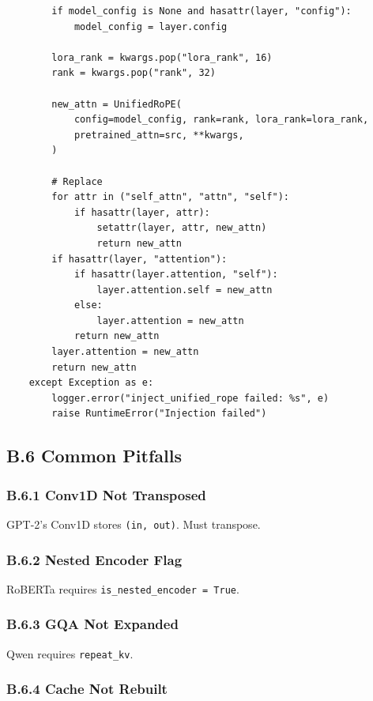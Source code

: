 {\begin{lstlisting}
        if model_config is None and hasattr(layer, "config"):
            model_config = layer.config
        
        lora_rank = kwargs.pop("lora_rank", 16)
        rank = kwargs.pop("rank", 32)
        
        new_attn = UnifiedRoPE(
            config=model_config, rank=rank, lora_rank=lora_rank,
            pretrained_attn=src, **kwargs,
        )
        
        # Replace
        for attr in ("self_attn", "attn", "self"):
            if hasattr(layer, attr):
                setattr(layer, attr, new_attn)
                return new_attn
        if hasattr(layer, "attention"):
            if hasattr(layer.attention, "self"):
                layer.attention.self = new_attn
            else:
                layer.attention = new_attn
            return new_attn
        layer.attention = new_attn
        return new_attn
    except Exception as e:
        logger.error("inject_unified_rope failed: %s", e)
        raise RuntimeError("Injection failed")
\end{lstlisting}

\subsection{B.6 Common Pitfalls}

\subsubsection{B.6.1 Conv1D Not Transposed}

GPT-2's Conv1D stores \texttt{(in, out)}. Must transpose.

\subsubsection{B.6.2 Nested Encoder Flag}

RoBERTa requires \texttt{is\_nested\_encoder = True}.

\subsubsection{B.6.3 GQA Not Expanded}

Qwen requires \texttt{repeat\_kv}.

\subsubsection{B.6.4 Cache Not Rebuilt}

}
